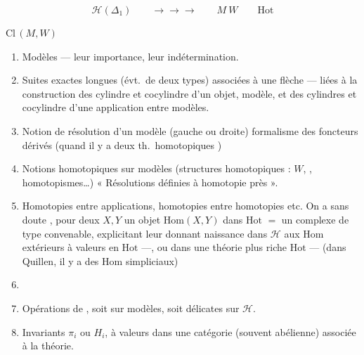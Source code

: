 \documentclass[11pt,a4paper]{article}
\begin{document}
\[
  \mathcal H(\Delta_1) \qquad \longrightarrow\longrightarrow\longrightarrow
  \qquad M \ W \qquad \mathrm{Hot}
\]


 \quad $\mathrm{Cl}\,(M, W)$ \ill{}

\begin{enumerate}
  \item[a)] Modèles --- leur importance, leur indétermination.
  \item[b)] Suites exactes longues (évt.\ de deux types) associées à une
  flèche --- liées à la construction des cylindre et cocylindre d'un
  objet, modèle, et \struck{\ill{}} des cylindres et cocylindre d'une
  application entre modèles.
  \item[c)] Notion de résolution d'un modèle (gauche ou droite) formalisme
  des foncteurs dérivés (quand il y a deux th.\ homotopiques ) 
  \item[d)] Notions homotopiques sur modèles (structures homotopiques :
  $W$, , homotopismes…) « Résolutions définies à
  homotopie près ».
  \item[e)] Homotopies entre applications, homotopies entre homotopies
  etc. On a sans doute \struck{\ill{}}, pour deux 
  $X, Y$ un objet $\mathrm{Hom}(X, Y)$ dans $\mathrm{Hot}$  \struck{\ill{}} $=$ un complexe de type convenable,
  explicitant \ill{} leur donnant naissance \ill{} dans $\mathcal H$ aux
  $\mathrm{Hom}$ extérieurs à valeurs en \ill{} $\mathrm{Hot}$ ---, ou
  dans une théorie plus riche $\mathrm{Hot}$ --- (dans Quillen, il y a
  des $\mathrm{Hom}$ simpliciaux)
  \item[] 
  \item[\uncertain{f)}] Opérations de \ill{}, soit 
  sur modèles, soit délicates sur $\mathcal H$.
  \item[\uncertain{g)}] Invariants $\pi_i$ ou $H_i$, à valeurs dans une
  catégorie (souvent abélienne) associée à la théorie.
\end{enumerate}
\end{document}
